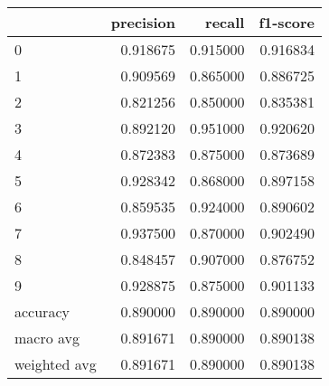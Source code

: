 \begin{tabular}{lrrr}
\toprule
 & precision & recall & f1-score \\
\midrule
0 & 0.918675 & 0.915000 & 0.916834 \\
1 & 0.909569 & 0.865000 & 0.886725 \\
2 & 0.821256 & 0.850000 & 0.835381 \\
3 & 0.892120 & 0.951000 & 0.920620 \\
4 & 0.872383 & 0.875000 & 0.873689 \\
5 & 0.928342 & 0.868000 & 0.897158 \\
6 & 0.859535 & 0.924000 & 0.890602 \\
7 & 0.937500 & 0.870000 & 0.902490 \\
8 & 0.848457 & 0.907000 & 0.876752 \\
9 & 0.928875 & 0.875000 & 0.901133 \\
accuracy & 0.890000 & 0.890000 & 0.890000 \\
macro avg & 0.891671 & 0.890000 & 0.890138 \\
weighted avg & 0.891671 & 0.890000 & 0.890138 \\
\bottomrule
\end{tabular}
